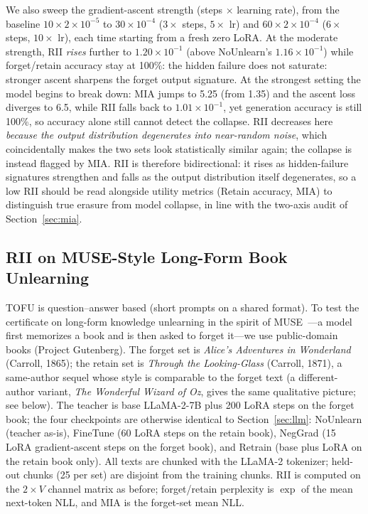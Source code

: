 \documentclass[smallextended]{svjour3}       %
\begin{document}
We also sweep the gradient-ascent strength (steps $\times$ learning rate), from the baseline $10\times 2{\times}10^{-5}$ to $30\times 10^{-4}$ ($3\times$ steps, $5\times$ lr) and $60\times 2{\times}10^{-4}$ ($6\times$ steps, $10\times$ lr), each time starting from a fresh zero LoRA. At the moderate strength, RII \emph{rises} further to $1.20{\times}10^{-1}$ (above NoUnlearn's $1.16{\times}10^{-1}$) while forget/retain accuracy stay at 100\%: the hidden failure does not saturate: stronger ascent sharpens the forget output signature. At the strongest setting the model begins to break down: MIA jumps to 5.25 (from 1.35) and the ascent loss diverges to 6.5, while RII falls back to $1.01{\times}10^{-1}$, yet generation accuracy is still 100\%, so accuracy alone still cannot detect the collapse. RII decreases here \emph{because the output distribution degenerates into near-random noise}, which coincidentally makes the two sets look statistically similar again; the collapse is instead flagged by MIA. RII is therefore bidirectional: it rises as hidden-failure signatures strengthen and falls as the output distribution itself degenerates, so a low RII should be read alongside utility metrics (Retain accuracy, MIA) to distinguish true erasure from model collapse, in line with the two-axis audit of Section~\ref{sec:mia}.

\subsection{RII on MUSE-Style Long-Form Book Unlearning}
\label{sec:muse}

TOFU is question--answer based (short prompts on a shared format). To test the certificate on long-form knowledge unlearning in the spirit of MUSE~\cite{shi2024muse}---a model first memorizes a book and is then asked to forget it---we use public-domain books (Project Gutenberg). The forget set is \emph{Alice's Adventures in Wonderland} (Carroll, 1865); the retain set is \emph{Through the Looking-Glass} (Carroll, 1871), a same-author sequel whose style is comparable to the forget text (a different-author variant, \emph{The Wonderful Wizard of Oz}, gives the same qualitative picture; see below). The teacher is base LLaMA-2-7B plus 200 LoRA steps on the forget book; the four checkpoints are otherwise identical to Section~\ref{sec:llm}: NoUnlearn (teacher as-is), FineTune (60 LoRA steps on the retain book), NegGrad (15 LoRA gradient-ascent steps on the forget book), and Retrain (base plus LoRA on the retain book only). All texts are chunked with the LLaMA-2 tokenizer; held-out chunks (25 per set) are disjoint from the training chunks. RII is computed on the $2\times V$ channel matrix as before; forget/retain perplexity is $\exp$ of the mean next-token NLL, and MIA is the forget-set mean NLL.
\end{document}

